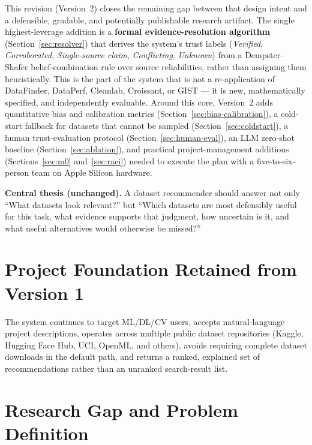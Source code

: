 \documentclass[11pt]{article}
\begin{document}
This revision (Version~2) closes the remaining gap between that design intent and a defensible,
gradable, and potentially publishable research artifact. The single highest-leverage addition is a
\textbf{formal evidence-resolution algorithm} (Section~\ref{sec:resolver}) that derives the system's
trust labels (\emph{Verified}, \emph{Corroborated}, \emph{Single-source claim}, \emph{Conflicting},
\emph{Unknown}) from a Dempster--Shafer belief-combination rule over source reliabilities, rather than
assigning them heuristically. This is the part of the system that is not a re-application of DataFinder,
DataPerf, Cleanlab, Croissant, or GIST --- it is new, mathematically specified, and independently
evaluable. Around this core, Version~2 adds quantitative bias and calibration metrics
(Section~\ref{sec:bias-calibration}), a cold-start fallback for datasets that cannot be sampled
(Section~\ref{sec:coldstart}), a human trust-evaluation protocol (Section~\ref{sec:human-eval}), an
LLM zero-shot baseline (Section~\ref{sec:ablation}), and practical project-management additions
(Sections~\ref{sec:m0} and~\ref{sec:raci}) needed to execute the plan with a five-to-six-person team on
Apple Silicon hardware.

\textbf{Central thesis (unchanged).} A dataset recommender should answer not only ``What datasets look
relevant?'' but ``Which datasets are most defensibly useful for this task, what evidence supports that
judgment, how uncertain is it, and what useful alternatives would otherwise be missed?''

\section{Project Foundation Retained from Version 1}
The system continues to target ML/DL/CV users, accepts natural-language project descriptions, operates
across multiple public dataset repositories (Kaggle, Hugging Face Hub, UCI, OpenML, and others), avoids
requiring complete dataset downloads in the default path, and returns a ranked, explained set of
recommendations rather than an unranked search-result list.

\section{Research Gap and Problem Definition}
\end{document}
